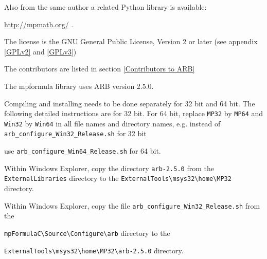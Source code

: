 \vpara
Also from the same author a related Python library is available:

\href{http://mpmath.org/}{http://mpmath.org/} . 


\vpara
The license is the GNU General Public License, Version 2 or later (see appendix \ref{GPLv2} and \ref{GPLv3})

The contributors are listed in section \ref{Contributors to ARB}

The mpformula library uses ARB version 2.5.0.



\vpara
Compiling and installing needs to be done separately for 32 bit and 64 bit. The following detailed instructions are for 32 bit. For 64 bit, replace \verb|MP32| by \verb|MP64| and \verb|Win32| by  \verb|Win64| in all file names and directory names, e.g. instead of \verb|arb_configure_Win32_Release.sh| for 32 bit

use \verb|arb_configure_Win64_Release.sh| for 64 bit.

\vpara
Within Windows Explorer, copy the directory \verb|arb-2.5.0|  from the \verb|ExternalLibraries|
directory to the \verb|ExternalTools\msys32\home\MP32| directory. 

\vpara
Within Windows Explorer, copy the file \verb|arb_configure_Win32_Release.sh|  from the

\verb|mpFormulaC\Source\Configure\arb| directory to the 

\verb|ExternalTools\msys32\home\MP32\arb-2.5.0| directory.  


